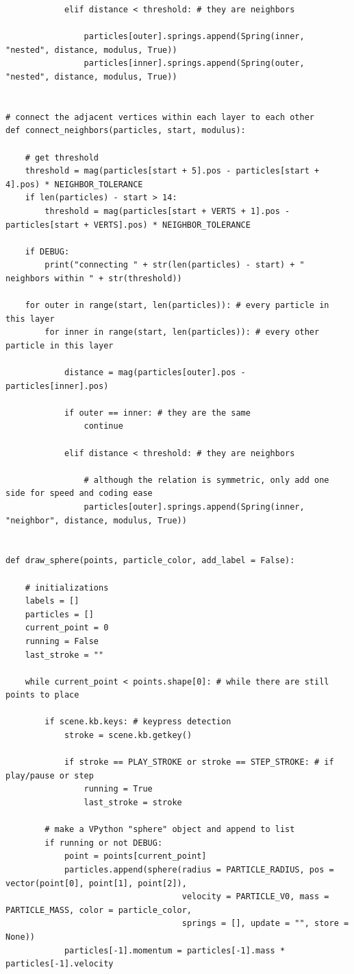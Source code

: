 \documentclass{article}
\begin{document}
\begin{verbatim}
            elif distance < threshold: # they are neighbors
                
                particles[outer].springs.append(Spring(inner, "nested", distance, modulus, True))
                particles[inner].springs.append(Spring(outer, "nested", distance, modulus, True))
        

# connect the adjacent vertices within each layer to each other 
def connect_neighbors(particles, start, modulus):

    # get threshold    
    threshold = mag(particles[start + 5].pos - particles[start + 4].pos) * NEIGHBOR_TOLERANCE
    if len(particles) - start > 14:
        threshold = mag(particles[start + VERTS + 1].pos - particles[start + VERTS].pos) * NEIGHBOR_TOLERANCE

    if DEBUG:
        print("connecting " + str(len(particles) - start) + " neighbors within " + str(threshold))
    
    for outer in range(start, len(particles)): # every particle in this layer
        for inner in range(start, len(particles)): # every other particle in this layer
            
            distance = mag(particles[outer].pos - particles[inner].pos)

            if outer == inner: # they are the same
                continue
            
            elif distance < threshold: # they are neighbors
                
                # although the relation is symmetric, only add one side for speed and coding ease
                particles[outer].springs.append(Spring(inner, "neighbor", distance, modulus, True))
         

def draw_sphere(points, particle_color, add_label = False):
    
    # initializations
    labels = []
    particles = []
    current_point = 0
    running = False
    last_stroke = ""

    while current_point < points.shape[0]: # while there are still points to place

        if scene.kb.keys: # keypress detection
            stroke = scene.kb.getkey()
            
            if stroke == PLAY_STROKE or stroke == STEP_STROKE: # if play/pause or step
                running = True
                last_stroke = stroke

        # make a VPython "sphere" object and append to list
        if running or not DEBUG:
            point = points[current_point]
            particles.append(sphere(radius = PARTICLE_RADIUS, pos = vector(point[0], point[1], point[2]),
                                    velocity = PARTICLE_V0, mass = PARTICLE_MASS, color = particle_color,
                                    springs = [], update = "", store = None))
            particles[-1].momentum = particles[-1].mass * particles[-1].velocity


\end{verbatim}
\end{document}
